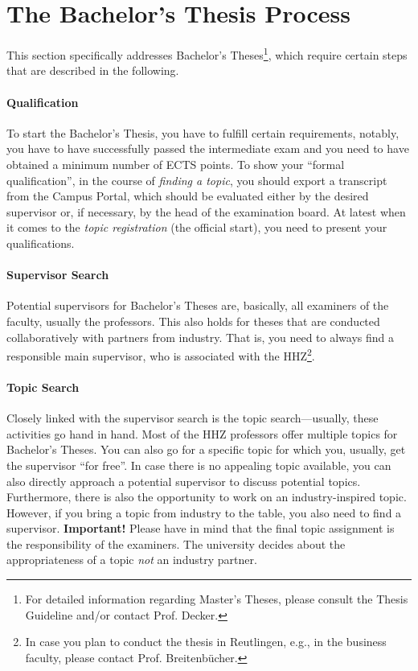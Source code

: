\section{The Bachelor's Thesis Process}
\label{sec:03:ThesisProcess}
This section specifically addresses Bachelor's Theses\footnote{For detailed information regarding Master's Theses, please consult the Thesis Guideline and/or contact Prof. Decker.}, which require certain steps that are described in the following.

\paragraph*{Qualification} 
To start the Bachelor's Thesis, you have to fulfill certain requirements, notably, you have to have successfully passed the intermediate exam and you need to have obtained a minimum number of ECTS points. To show your ``formal qualification'', in the course of \emph{finding a topic}, you should export a transcript from the Campus Portal, which should be evaluated either by the desired supervisor or, if necessary, by the head of the examination board. At latest when it comes to the \emph{topic registration} (the official start), you need to present your qualifications.

\paragraph*{Supervisor Search} 
Potential supervisors for Bachelor's Theses are, basically, all examiners of the faculty, usually the professors. This also holds for theses that are conducted collaboratively with partners from industry. That is, you need to always find a responsible main supervisor, who is associated with the HHZ\footnote{In case you plan to conduct the thesis in Reutlingen, e.g., in the business faculty, please contact Prof. Breitenb\"ucher.}.

\paragraph*{Topic Search}
Closely linked with the supervisor search is the topic search---usually, these activities go hand in hand. Most of the HHZ professors offer multiple topics for Bachelor's Theses. You can also go for a specific topic for which you, usually, get the supervisor ``for free''. In case there is no appealing topic available, you can also directly approach a potential supervisor to discuss potential topics. Furthermore, there is also the opportunity to work on an industry-inspired topic. However, if you bring a topic from industry to the table, you also need to find a supervisor. \textbf{Important!} Please have in mind that the final topic assignment is the responsibility of the examiners. The university decides about the appropriateness of a topic \emph{not} an industry partner.

